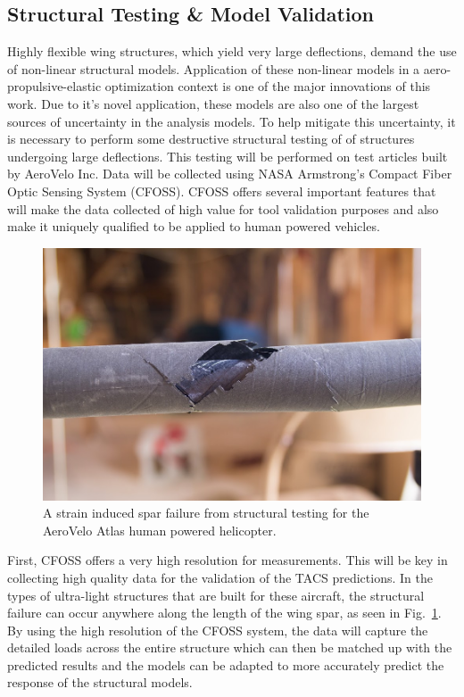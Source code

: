 \documentclass[]{aiaa-tc}
\begin{document}
    \subsection{Structural Testing \& Model Validation}
        
        Highly flexible wing structures, which yield very large deflections, demand the use of non-linear structural models. 
        Application of these non-linear models in a aero-propulsive-elastic optimization context is one of the major innovations of this 
        work. Due to it's novel application, these models are also one of the largest sources of uncertainty in the analysis models. 
        To help mitigate this uncertainty, it is necessary to perform some destructive structural testing of of structures undergoing large 
        deflections. This testing will be performed on test articles built by AeroVelo Inc. Data will be collected using 
        NASA Armstrong's Compact Fiber Optic Sensing System (CFOSS). CFOSS offers several important features that will make the 
        data collected of high value for tool validation purposes and also make it uniquely qualified to be applied to human powered vehicles. 

        \begin{figure}[!hbt]
            \centering
            \includegraphics[width=.5\textwidth]{images/spar_failure}
            \caption{A strain induced spar failure from structural testing for the AeroVelo Atlas human powered helicopter.}
            \label{fig:spar-failure}
        \end{figure}

        First, CFOSS offers a very high resolution for measurements. This will be key in collecting high quality data for the validation 
        of the TACS predictions. In the types of ultra-light structures that are built for these aircraft, the structural failure can 
        occur anywhere along the length of the wing spar, as seen in Fig.~\ref{fig:spar-failure}. By using the 
        high resolution of the CFOSS system, the data will capture the detailed loads across the entire structure 
        which can then be matched up with the predicted results and the models can be adapted to more accurately 
        predict the response of the structural models.
\end{document}

